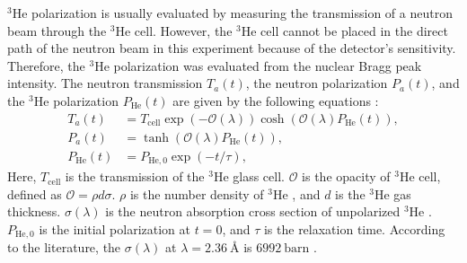 \documentclass[%
 reprint,
superscriptaddress,
 amsmath,amssymb,
 aps,
floatfix,
]{revtex4-2}
\newcommand{\He}{$^3$He }
\begin{document}
    \label{sec:He-3}
    \He polarization is usually evaluated by measuring the transmission of a neutron beam through the \He cell.
    However, the \He cell cannot be placed in the direct path of the neutron beam in this experiment because of the detector's sensitivity.
    Therefore, the \He polarization was evaluated from the nuclear Bragg peak intensity.
    The neutron transmission $T_a(t)$, the neutron polarization $P_a(t)$, and the \He polarization $P_\mathrm{He}(t)$ are given by the following equations \cite{coulter_neutron_1990}:
    \begin{align}
        T_a(t) &= T_\mathrm{cell}\exp(-\mathcal{O}(\lambda))\cosh(\mathcal{O}(\lambda)P_\mathrm{He}(t)),
        \label{eq:transmission_3He}\\
        P_a(t) &= \tanh(\mathcal{O}(\lambda)P_\mathrm{He}(t)),
        \label{eq:pol_n3He}\\
        P_\mathrm{He}(t) &= P_\mathrm{He,0} \exp(-t/\tau),
        \label{eq:pol_3He}
    \end{align}
    Here, $T_\mathrm{cell}$ is the transmission of the \He glass cell.
    $\mathcal{O}$ is the opacity of \He cell, defined as $\mathcal{O} = \rho d \sigma$.
    $\rho$ is the number density of \He, and $d$ is the \He gas thickness.
    $\sigma(\lambda)$ is the neutron absorption cross section of unpolarized \He.
    $P_{\mathrm{He},0}$ is the initial polarization at $t=0$, and $\tau$ is the relaxation time.
    According to the literature, the $\sigma(\lambda)$ at $\lambda = 2.36\ \textrm{\AA}$ is $6992~\textrm{barn}$ \cite{passell_measurement_1966}.
\end{document}
